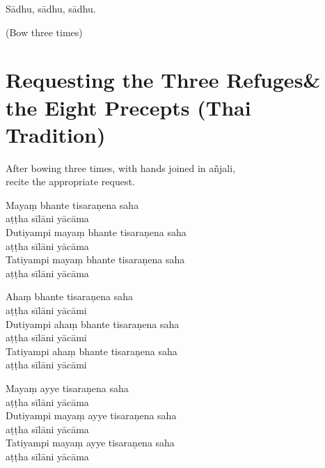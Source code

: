 Sādhu, sādhu, sādhu.

\begin{instruction}
  (Bow three times)
\end{instruction}

\clearpage

\section[Three Refuges \& the Eight Precepts]{Requesting the Three Refuges\newline \& the Eight Precepts (Thai Tradition)}

\label{eight-precepts}

\begin{instruction}
  After bowing three times, with hands joined in añjali,\\
  recite the appropriate request.
\end{instruction}

\ifhandbookedition
\enlargethispage{\baselineskip}
\fi


Mayaṃ bhante tisaraṇena saha\\\vin aṭṭha sīlāni yācāma\\
Dutiyampi mayaṃ bhante tisaraṇena saha\\\vin aṭṭha sīlāni yācāma\\
Tatiyampi mayaṃ bhante tisaraṇena saha\\\vin aṭṭha sīlāni yācāma


Ahaṃ bhante tisaraṇena saha\\\vin aṭṭha sīlāni yācāmi\\
Dutiyampi ahaṃ bhante tisaraṇena saha\\\vin aṭṭha sīlāni yācāmi\\
Tatiyampi ahaṃ bhante tisaraṇena saha\\\vin aṭṭha sīlāni yācāmi


Mayaṃ ayye tisaraṇena saha\\\vin aṭṭha sīlāni yācāma\\
Dutiyampi mayaṃ ayye tisaraṇena saha\\\vin aṭṭha sīlāni yācāma\\
Tatiyampi mayaṃ ayye tisaraṇena saha\\\vin aṭṭha sīlāni yācāma

